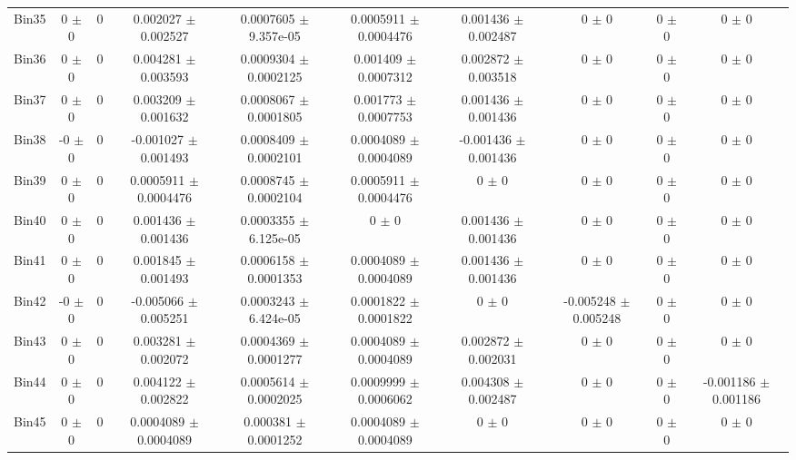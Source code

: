 \begin{tabular}{@{\extracolsep{4pt}}lccccccccc@{}}
     Bin35 & 0 $\pm$ 0 & 0 & 0.002027 $\pm$ 0.002527 & 0.0007605 $\pm$ 9.357e-05 & 0.0005911 $\pm$ 0.0004476 & 0.001436 $\pm$ 0.002487 & 0 $\pm$ 0 & 0 $\pm$ 0 & 0 $\pm$ 0 \\ 
     Bin36 & 0 $\pm$ 0 & 0 & 0.004281 $\pm$ 0.003593 & 0.0009304 $\pm$ 0.0002125 & 0.001409 $\pm$ 0.0007312 & 0.002872 $\pm$ 0.003518 & 0 $\pm$ 0 & 0 $\pm$ 0 & 0 $\pm$ 0 \\ 
     Bin37 & 0 $\pm$ 0 & 0 & 0.003209 $\pm$ 0.001632 & 0.0008067 $\pm$ 0.0001805 & 0.001773 $\pm$ 0.0007753 & 0.001436 $\pm$ 0.001436 & 0 $\pm$ 0 & 0 $\pm$ 0 & 0 $\pm$ 0 \\ 
     Bin38 & -0 $\pm$ 0 & 0 & -0.001027 $\pm$ 0.001493 & 0.0008409 $\pm$ 0.0002101 & 0.0004089 $\pm$ 0.0004089 & -0.001436 $\pm$ 0.001436 & 0 $\pm$ 0 & 0 $\pm$ 0 & 0 $\pm$ 0 \\ 
     Bin39 & 0 $\pm$ 0 & 0 & 0.0005911 $\pm$ 0.0004476 & 0.0008745 $\pm$ 0.0002104 & 0.0005911 $\pm$ 0.0004476 & 0 $\pm$ 0 & 0 $\pm$ 0 & 0 $\pm$ 0 & 0 $\pm$ 0 \\ 
     Bin40 & 0 $\pm$ 0 & 0 & 0.001436 $\pm$ 0.001436 & 0.0003355 $\pm$ 6.125e-05 & 0 $\pm$ 0 & 0.001436 $\pm$ 0.001436 & 0 $\pm$ 0 & 0 $\pm$ 0 & 0 $\pm$ 0 \\ 
     Bin41 & 0 $\pm$ 0 & 0 & 0.001845 $\pm$ 0.001493 & 0.0006158 $\pm$ 0.0001353 & 0.0004089 $\pm$ 0.0004089 & 0.001436 $\pm$ 0.001436 & 0 $\pm$ 0 & 0 $\pm$ 0 & 0 $\pm$ 0 \\ 
     Bin42 & -0 $\pm$ 0 & 0 & -0.005066 $\pm$ 0.005251 & 0.0003243 $\pm$ 6.424e-05 & 0.0001822 $\pm$ 0.0001822 & 0 $\pm$ 0 & -0.005248 $\pm$ 0.005248 & 0 $\pm$ 0 & 0 $\pm$ 0 \\ 
     Bin43 & 0 $\pm$ 0 & 0 & 0.003281 $\pm$ 0.002072 & 0.0004369 $\pm$ 0.0001277 & 0.0004089 $\pm$ 0.0004089 & 0.002872 $\pm$ 0.002031 & 0 $\pm$ 0 & 0 $\pm$ 0 & 0 $\pm$ 0 \\ 
     Bin44 & 0 $\pm$ 0 & 0 & 0.004122 $\pm$ 0.002822 & 0.0005614 $\pm$ 0.0002025 & 0.0009999 $\pm$ 0.0006062 & 0.004308 $\pm$ 0.002487 & 0 $\pm$ 0 & 0 $\pm$ 0 & -0.001186 $\pm$ 0.001186 \\ 
     Bin45 & 0 $\pm$ 0 & 0 & 0.0004089 $\pm$ 0.0004089 & 0.000381 $\pm$ 0.0001252 & 0.0004089 $\pm$ 0.0004089 & 0 $\pm$ 0 & 0 $\pm$ 0 & 0 $\pm$ 0 & 0 $\pm$ 0 \\ 
\hline\hline
  \end{tabular}
